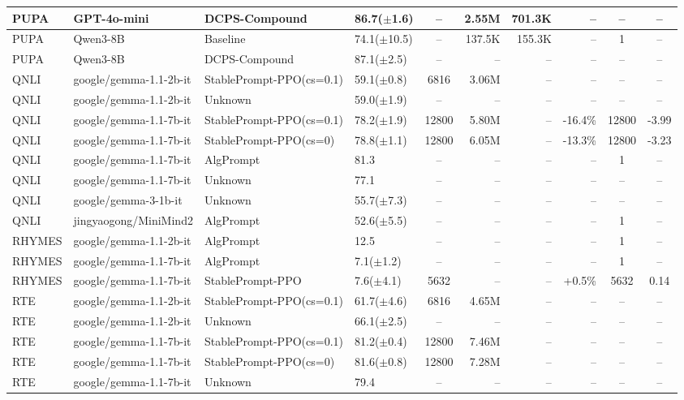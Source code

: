 {\begin{longtable}{@{}p{5.5cm}p{4.5cm}p{2.5cm}lcrrrcc@{}}
PUPA & GPT-4o-mini & DCPS-Compound & 86.7($\pm$1.6) & -- & 2.55M & 701.3K & -- & -- & -- \\
\midrule
PUPA & Qwen3-8B & Baseline & 74.1($\pm$10.5) & -- & 137.5K & 155.3K & -- & 1 & -- \\
PUPA & Qwen3-8B & DCPS-Compound & 87.1($\pm$2.5) & -- & -- & -- & -- & -- & -- \\
\midrule
QNLI & google/gemma-1.1-2b-it & StablePrompt-PPO(cs=0.1) & 59.1($\pm$0.8) & 6816 & 3.06M & -- & -- & -- & -- \\
QNLI & google/gemma-1.1-2b-it & Unknown & 59.0($\pm$1.9) & -- & -- & -- & -- & -- & -- \\
\midrule
QNLI & google/gemma-1.1-7b-it & StablePrompt-PPO(cs=0.1) & 78.2($\pm$1.9) & 12800 & 5.80M & -- & -16.4\% & 12800 & -3.99 \\
QNLI & google/gemma-1.1-7b-it & StablePrompt-PPO(cs=0) & 78.8($\pm$1.1) & 12800 & 6.05M & -- & -13.3\% & 12800 & -3.23 \\
QNLI & google/gemma-1.1-7b-it & AlgPrompt & 81.3 & -- & -- & -- & -- & 1 & -- \\
QNLI & google/gemma-1.1-7b-it & Unknown & 77.1 & -- & -- & -- & -- & -- & -- \\
\midrule
QNLI & google/gemma-3-1b-it & Unknown & 55.7($\pm$7.3) & -- & -- & -- & -- & -- & -- \\
\midrule
QNLI & jingyaogong/MiniMind2 & AlgPrompt & 52.6($\pm$5.5) & -- & -- & -- & -- & 1 & -- \\
\midrule
RHYMES & google/gemma-1.1-2b-it & AlgPrompt & 12.5 & -- & -- & -- & -- & 1 & -- \\
\midrule
RHYMES & google/gemma-1.1-7b-it & AlgPrompt & 7.1($\pm$1.2) & -- & -- & -- & -- & 1 & -- \\
RHYMES & google/gemma-1.1-7b-it & StablePrompt-PPO & 7.6($\pm$4.1) & 5632 & -- & -- & +0.5\% & 5632 & 0.14 \\
\midrule
RTE & google/gemma-1.1-2b-it & StablePrompt-PPO(cs=0.1) & 61.7($\pm$4.6) & 6816 & 4.65M & -- & -- & -- & -- \\
RTE & google/gemma-1.1-2b-it & Unknown & 66.1($\pm$2.5) & -- & -- & -- & -- & -- & -- \\
\midrule
RTE & google/gemma-1.1-7b-it & StablePrompt-PPO(cs=0.1) & 81.2($\pm$0.4) & 12800 & 7.46M & -- & -- & -- & -- \\
RTE & google/gemma-1.1-7b-it & StablePrompt-PPO(cs=0) & 81.6($\pm$0.8) & 12800 & 7.28M & -- & -- & -- & -- \\
RTE & google/gemma-1.1-7b-it & Unknown & 79.4 & -- & -- & -- & -- & -- & -- \\

\end{longtable}}

